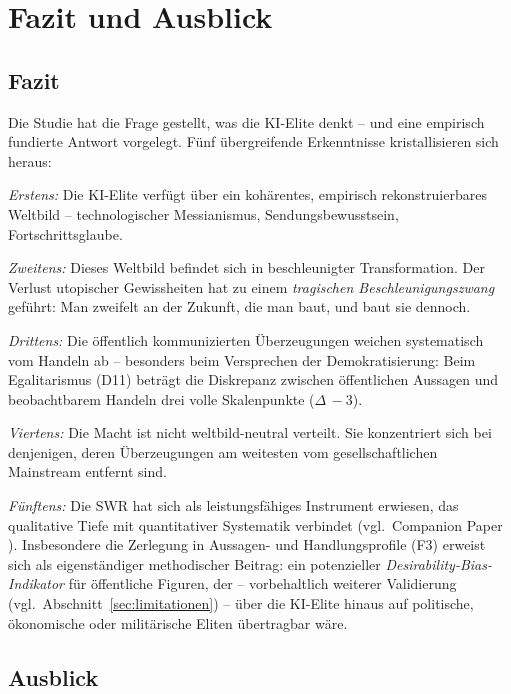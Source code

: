 \documentclass[12pt,a4paper]{article}
\begin{document}
\section{Fazit und Ausblick}
\label{sec:fazit}

\subsection{Fazit}

Die Studie hat die Frage gestellt, was die KI-Elite denkt -- und eine empirisch fundierte Antwort vorgelegt. F\"unf \"ubergreifende Erkenntnisse kristallisieren sich heraus:

\emph{Erstens:} Die KI-Elite verf\"ugt \"uber ein koh\"arentes, empirisch rekonstruierbares Weltbild -- technologischer Messianismus, Sendungsbewusstsein, Fortschrittsglaube.

\emph{Zweitens:} Dieses Weltbild befindet sich in beschleunigter Transformation. Der Verlust utopischer Gewissheiten hat zu einem \emph{tragischen Beschleunigungszwang} gef\"uhrt: Man zweifelt an der Zukunft, die man baut, und baut sie dennoch.

\emph{Drittens:} Die \"offentlich kommunizierten \"Uberzeugungen weichen systematisch vom Handeln ab -- besonders beim Versprechen der Demokratisierung: Beim Egalitarismus (D11) betr\"agt die Diskrepanz zwischen \"offentlichen Aussagen und beobachtbarem Handeln drei volle Skalenpunkte ($\Delta\,-3$).

\emph{Viertens:} Die Macht ist nicht weltbild-neutral verteilt. Sie konzentriert sich bei denjenigen, deren \"Uberzeugungen am weitesten vom gesellschaftlichen Mainstream entfernt sind.

\emph{F\"unftens:} Die SWR hat sich als leistungsf\"ahiges Instrument erwiesen, das qualitative Tiefe mit quantitativer Systematik verbindet (vgl.\ Companion Paper \citealt{Geiger2026SWR}). Insbesondere die Zerlegung in Aussagen- und Handlungsprofile (F3) erweist sich als eigenst\"andiger methodischer Beitrag: ein potenzieller \emph{Desirability-Bias-Indikator} f\"ur \"offentliche Figuren, der -- vorbehaltlich weiterer Validierung (vgl.\ Abschnitt~\ref{sec:limitationen}) -- \"uber die KI-Elite hinaus auf politische, \"okonomische oder milit\"arische Eliten \"ubertragbar w\"are.

\subsection{Ausblick}
\end{document}
